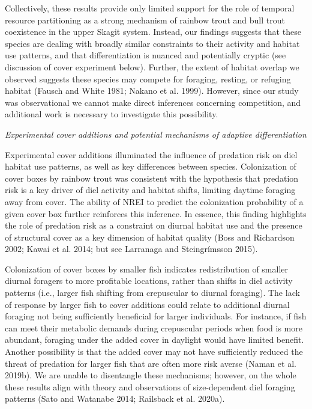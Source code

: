 \documentclass[]{article}
\begin{document}
Collectively, these results provide only limited support for the role of
temporal resource partitioning as a strong mechanism of rainbow trout
and bull trout coexistence in the upper Skagit system. Instead, our
findings suggests that these species are dealing with broadly similar
constraints to their activity and habitat use patterns, and that
differentiation is nuanced and potentially cryptic (see discussion of
cover experiment below). Further, the extent of habitat overlap we
observed suggests these species may compete for foraging, resting, or
refuging habitat (Fausch and White 1981; Nakano et al. 1999). However,
since our study was observational we cannot make direct inferences
concerning competition, and additional work is necessary to investigate
this possibility.

\emph{Experimental cover additions and potential mechanisms of adaptive
differentiation}

Experimental cover additions illuminated the influence of predation risk
on diel habitat use patterns, as well as key differences between
species. Colonization of cover boxes by rainbow trout was consistent
with the hypothesis that predation risk is a key driver of diel activity
and habitat shifts, limiting daytime foraging away from cover. The
ability of NREI to predict the colonization probability of a given cover
box further reinforces this inference. In essence, this finding
highlights the role of predation risk as a constraint on diurnal habitat
use and the presence of structural cover as a key dimension of habitat
quality (Boss and Richardson 2002; Kawai et al. 2014; but see Larranaga
and Steingrímsson 2015).

Colonization of cover boxes by smaller fish indicates redistribution of
smaller diurnal foragers to more profitable locations, rather than
shifts in diel activity patterns (i.e., larger fish shifting from
crepuscular to diurnal foraging). The lack of response by larger fish to
cover additions could relate to additional diurnal foraging not being
sufficiently beneficial for larger individuals. For instance, if fish
can meet their metabolic demands during crepuscular periods when food is
more abundant, foraging under the added cover in daylight would have
limited benefit. Another possibility is that the added cover may not
have sufficiently reduced the threat of predation for larger fish that
are often more risk averse (Naman et al. 2019b). We are unable to
disentangle these mechanisms; however, on the whole these results align
with theory and observations of size-dependent diel foraging patterns
(Sato and Watanabe 2014; Railsback et al. 2020a).
\end{document}
